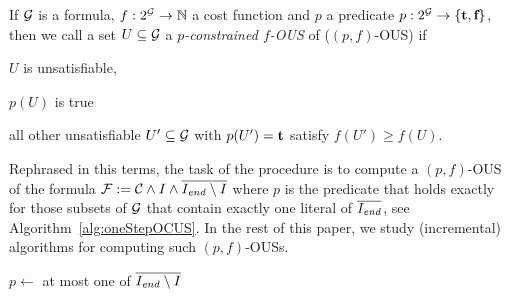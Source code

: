 \begin{definition}
    If $\mathcal{G} $ is a formula, $f:2^{\mathcal{G} } \to \mathbb{N}$ a cost function and  $p$ a predicate $p: 2^{\mathcal{G} }\to \{\textbf{t},\textbf{f}\}$, then we call a set $U\subseteq \mathcal{G} $ a \emph{$p$-constrained $f$-OUS} of \formulag ($(p,f)$-OUS)   if \begin{compactitem}                                                                                                                                                                                                                         
    \item $U$ is unsatisfiable,
    \item $p(U)$ is true
    \item all other unsatisfiable $U'\subseteq \mathcal{G} $ with $p(U')=\textbf{t}$ satisfy $f(U')\geq f(U)$.                                                                                                                                                                                                                         \end{compactitem}
\end{definition}

Rephrased in this terms, the task of the procedure \onestep is to compute a $(p,f)$-OUS of the formula $\mathcal{F}  := \mathcal{C} \land I\land \overline{I_\mathit{end} \setminus I}$ where $p$ is the predicate that holds exactly for those subsets of $\mathcal{G} $ that contain exactly one literal of $\overline{I_\mathit{end} }$, see Algorithm~\eqref{alg:oneStepOCUS}. 
In the rest of this paper, we study (incremental) algorithms for computing such $(p,f)$-OUSs. 

\newcommand\onestepo{\ensuremath{\call{explain-One-Step-OCUS}}\xspace}
\begin{algorithm}[t]
  \DontPrintSemicolon
  
  \caption{$\onestepo(\formulac,f,I,\Iend)$}
  \label{alg:oneStepOCUS}
  $p \leftarrow$ at most one of $\overline{I_\mathit{end} \setminus I}$\;
\end{algorithm}



